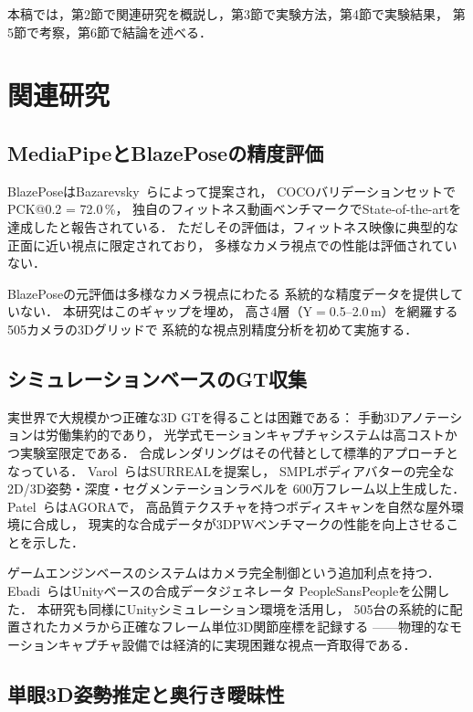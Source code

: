 \documentclass[twocolumn]{article}
\begin{document}
本稿では，第2節で関連研究を概説し，第3節で実験方法，第4節で実験結果，
第5節で考察，第6節で結論を述べる．

\section{関連研究}

\subsection{MediaPipeとBlazePoseの精度評価}

BlazePoseはBazarevsky~ら\cite{blazepose}によって提案され，
COCOバリデーションセットでPCK@0.2 = 72.0\,\%，
独自のフィットネス動画ベンチマークでState-of-the-artを達成したと報告されている．
ただしその評価は，フィットネス映像に典型的な正面に近い視点に限定されており，
多様なカメラ視点での性能は評価されていない．

BlazePoseの元評価\cite{blazepose}は多様なカメラ視点にわたる
系統的な精度データを提供していない．
本研究はこのギャップを埋め，
高さ4層（Y$=$0.5--2.0\,m）を網羅する505カメラの3Dグリッドで
系統的な視点別精度分析を初めて実施する．

\subsection{シミュレーションベースのGT収集}

実世界で大規模かつ正確な3D GTを得ることは困難である：
手動3Dアノテーションは労働集約的であり，
光学式モーションキャプチャシステムは高コストかつ実験室限定である．
合成レンダリングはその代替として標準的アプローチとなっている．
Varol~ら\cite{surreal}はSURREALを提案し，
SMPLボディアバターの完全な2D/3D姿勢・深度・セグメンテーションラベルを
600万フレーム以上生成した．
Patel~ら\cite{agora}はAGORAで，
高品質テクスチャを持つボディスキャンを自然な屋外環境に合成し，
現実的な合成データが3DPWベンチマークの性能を向上させることを示した．

ゲームエンジンベースのシステムはカメラ完全制御という追加利点を持つ．
Ebadi~ら\cite{peoplesanspeople}はUnityベースの合成データジェネレータ
PeopleSansPeopleを公開した．
本研究も同様にUnityシミュレーション環境を活用し，
505台の系統的に配置されたカメラから正確なフレーム単位3D関節座標を記録する
——物理的なモーションキャプチャ設備では経済的に実現困難な視点一斉取得である．

\subsection{単眼3D姿勢推定と奥行き曖昧性}
\end{document}
